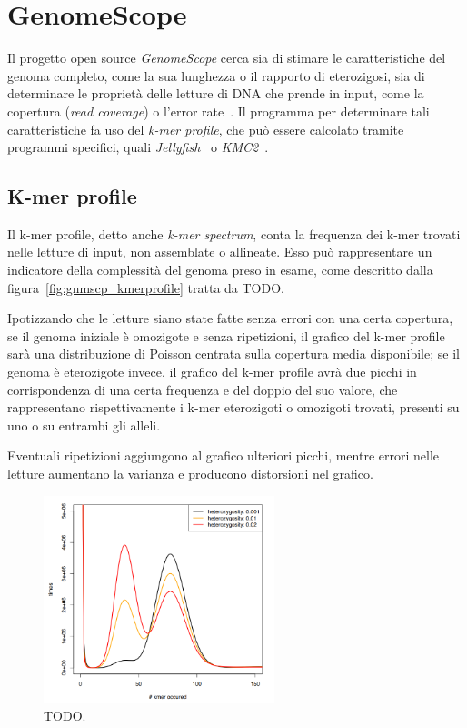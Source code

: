 \documentclass[crop=false, class=book]{standalone}
\begin{document}
	\chapter{GenomeScope}
	
	Il progetto open source \textit{GenomeScope} cerca sia di stimare le caratteristiche del genoma completo, come la sua lunghezza o il rapporto di eterozigosi, sia di determinare le proprietà delle letture di DNA che prende in input, come la copertura (\textit{read coverage}) o l'error rate~\cite{vurture2017genomescope}. Il programma per determinare tali caratteristiche fa uso del \textit{k-mer profile}, che può essere calcolato tramite programmi specifici, quali \textit{Jellyfish}~\cite{marcais2011fast} o \textit{KMC2}~\cite{deorowicz2015KMC}.
	
	\section{K-mer profile}
	Il k-mer profile, detto anche \textit{k-mer spectrum}, conta la frequenza dei k-mer trovati nelle letture di input, non assemblate o allineate. Esso può rappresentare un indicatore della complessità del genoma preso in esame, come descritto dalla figura~\vref{fig:gnmscp_kmerprofile} tratta da TODO. 
	
	Ipotizzando che le letture siano state fatte senza errori con una certa copertura, se il genoma iniziale è omozigote e senza ripetizioni, il grafico del k-mer profile sarà una distribuzione di Poisson centrata sulla copertura media disponibile; se il genoma è eterozigote invece, il grafico del k-mer profile avrà due picchi in corrispondenza di una certa frequenza e del doppio del suo valore, che rappresentano rispettivamente i k-mer eterozigoti o omozigoti trovati, presenti su uno o su entrambi gli alleli. 
	
	Eventuali ripetizioni aggiungono al grafico ulteriori picchi, mentre errori nelle letture aumentano la varianza e producono distorsioni nel grafico.
	
	\begin{figure}
		\centering
		\includegraphics[width=0.6\textwidth]{./resources/images/gnmscp_kmerprofile.png}
		\caption{TODO.}
		\label{fig:gnmscp_kmerprofile}
	\end{figure}
\end{document}
